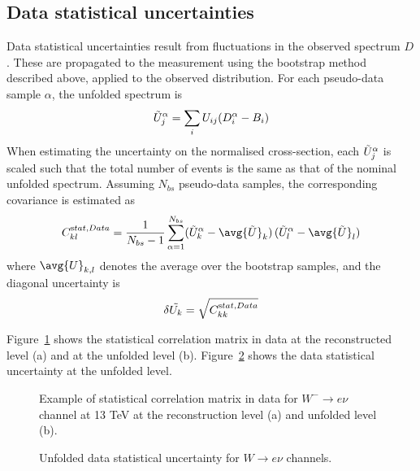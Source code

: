 \subsection{Data statistical uncertainties}
\label{subsec:datastatunc}
Data statistical uncertainties result from fluctuations in the observed spectrum $D$. These are propagated to the measurement using the bootstrap method described above, applied to the observed
distribution. For each pseudo-data sample $\alpha$, the unfolded spectrum is
\begin{equation}
\Tilde{U}_j^\alpha = \sum_{i}  U_{ij} (D_i^\alpha - B_i)
\end{equation}
When estimating the uncertainty on the normalised cross-section, each $\Tilde{U}_j^\alpha$ is scaled such that the total number of events is the same as that of the nominal unfolded spectrum.
Assuming $N_{bs}$ pseudo-data samples, the corresponding covariance is estimated as
\begin{equation}
C_{kl}^{\textrm stat,Data} = \frac{1}{N_{bs}-1} \sum_{\alpha=1}^{N_{bs}} (\tilde{U}^\alpha_k-\avg{\tilde{U}}_k) \, (\tilde{U}^\alpha_l-\avg{\tilde{U}}_l)
\label{eq:covexpr}
\end{equation}
where $\avg{U}_{k,l}$ denotes the average over the bootstrap samples, and the diagonal uncertainty is
\begin{equation}
\delta \tilde{U_k} = \sqrt{C_{kk}^{\textrm stat,Data}}
\end{equation}

Figure~\ref{fig:corrStatData} shows the statistical correlation matrix in data at the reconstructed level (a) and at the unfolded level (b). Figure~\ref{fig:unfDataStat} shows the data statistical uncertainty at the unfolded level.

\begin{figure}[h]
  \centering
  \caption{ Example of statistical correlation matrix in data for $W^{-}\rightarrow e\nu$ channel at 13 TeV at the reconstruction level (a) and unfolded level (b).}
  \label{fig:corrStatData}
\end{figure}

\begin{figure}[h]
  \centering
  
  \caption{Unfolded data statistical uncertainty for $W\rightarrow e\nu$ channels.}
  \label{fig:unfDataStat}
\end{figure}

